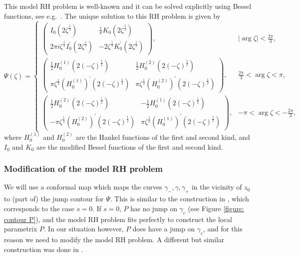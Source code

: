 \documentclass[11pt,fleqn]{article}
\numberwithin{equation}{section}
\begin{document}
This model RH problem is well-known and it can be solved explicitly using Bessel functions, see e.g.\ \cite{Kuijlaars2, Krasovsky}. The unique solution to this RH problem is given by 
\begin{equation}\label{Psi explicit}
\Psi(\zeta)=\begin{cases}
\begin{pmatrix}
I_{0}(2\zeta^{\frac{1}{2}}) & \frac{i}{\pi} K_{0}(2\zeta^{\frac{1}{2}}) \\
2\pi i \zeta^{\frac{1}{2}} I_{0}^{\prime}(2\zeta^{\frac{1}{2}}) & -2\zeta^{\frac{1}{2}} K_{0}^{\prime}(2\zeta^{\frac{1}{2}})
\end{pmatrix}, & |\arg \zeta | < \frac{2\pi}{3}, \\

\begin{pmatrix}
\frac{1}{2} H_{0}^{(1)}(2(-\zeta)^{\frac{1}{2}}) & \frac{1}{2} H_{0}^{(2)}(2(-\zeta)^{\frac{1}{2}}) \\
\pi \zeta^{\frac{1}{2}} \left( H_{0}^{(1)} \right)^{\prime} (2(-\zeta)^{\frac{1}{2}}) & \pi \zeta^{\frac{1}{2}} \left( H_{0}^{(2)} \right)^{\prime} (2(-\zeta)^{\frac{1}{2}})
\end{pmatrix}, & \frac{2\pi}{3} < \arg \zeta < \pi, \\

\begin{pmatrix}
\frac{1}{2} H_{0}^{(2)}(2(-\zeta)^{\frac{1}{2}}) & -\frac{1}{2} H_{0}^{(1)}(2(-\zeta)^{\frac{1}{2}}) \\
-\pi \zeta^{\frac{1}{2}} \left( H_{0}^{(2)} \right)^{\prime} (2(-\zeta)^{\frac{1}{2}}) & \pi \zeta^{\frac{1}{2}} \left( H_{0}^{(1)} \right)^{\prime} (2(-\zeta)^{\frac{1}{2}})
\end{pmatrix}, & -\pi < \arg \zeta < -\frac{2\pi}{3},
\end{cases}
\end{equation}
where $H_0^{(1)}$ and $H_0^{(2)}$ are the Hankel functions of the first and second kind, and $I_0$ and $K_0$ are the modified Bessel functions of the first and second kind.



\subsubsection{Modification of the model RH problem}

We will use a conformal map which maps the curves $\gamma_-, \gamma, \gamma_+$ in the vicinity of $z_0$ to (part of) the jump contour for $\Psi$. This is similar to the construction in \cite{Krasovsky}, which corresponds to the case $s=0$. If $s=0$, $P$ has no jump on $\gamma_c$ (see Figure \ref{figure: contour P}), and the model RH problem fits perfectly to construct the local parametrix $P$. In our situation however, $P$ does have a jump on $\gamma_c$, and for this reason we need to modify the model RH problem. A different but similar construction was done in \cite{BDIK}.
\end{document}
